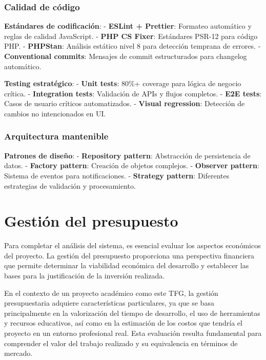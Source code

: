 \documentclass[12pt,a4paper,oneside]{report}
\begin{document}
\subsubsection{Calidad de código}\label{calidad-de-cuxf3digo}

\textbf{Estándares de codificación}: - \textbf{ESLint + Prettier}:
Formateo automático y reglas de calidad JavaScript. - \textbf{PHP CS
Fixer}: Estándares PSR-12 para código PHP. - \textbf{PHPStan}: Análisis
estático nivel 8 para detección temprana de errores. -
\textbf{Conventional commits}: Mensajes de commit estructurados para
changelog automático.

\textbf{Testing estratégico}: - \textbf{Unit tests}: 80\%+ coverage para
lógica de negocio crítica. - \textbf{Integration tests}: Validación de
APIs y flujos completos. - \textbf{E2E tests}: Casos de usuario críticos
automatizados. - \textbf{Visual regression}: Detección de cambios no
intencionados en UI.

\subsubsection{Arquitectura mantenible}\label{arquitectura-mantenible}

\textbf{Patrones de diseño}: - \textbf{Repository pattern}: Abstracción
de persistencia de datos. - \textbf{Factory pattern}: Creación de
objetos complejos. - \textbf{Observer pattern}: Sistema de eventos para
notificaciones. - \textbf{Strategy pattern}: Diferentes estrategias de
validación y procesamiento.

\section{Gestión del presupuesto}\label{gestiuxf3n-del-presupuesto}

Para completar el análisis del sistema, es esencial evaluar los aspectos
económicos del proyecto. La gestión del presupuesto proporciona una
perspectiva financiera que permite determinar la viabilidad económica
del desarrollo y establecer las bases para la justificación de la
inversión realizada.

En el contexto de un proyecto académico como este TFG, la gestión
presupuestaria adquiere características particulares, ya que se basa
principalmente en la valorización del tiempo de desarrollo, el uso de
herramientas y recursos educativos, así como en la estimación de los
costos que tendría el proyecto en un entorno profesional real. Esta
evaluación resulta fundamental para comprender el valor del trabajo
realizado y su equivalencia en términos de mercado.
\end{document}
